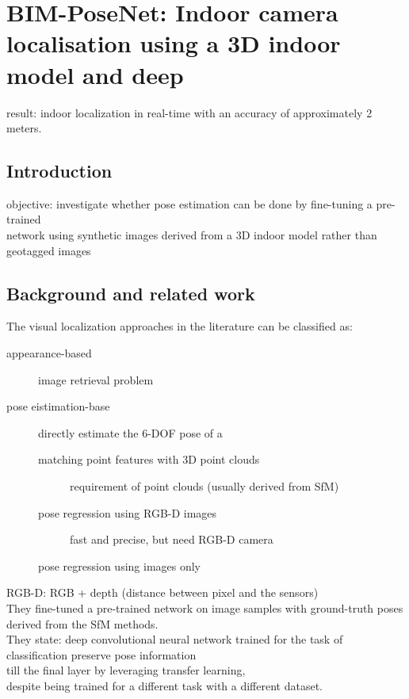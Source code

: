 \documentclass[11pt]{article}
\begin{document}
\section{BIM-PoseNet: Indoor camera localisation using a 3D indoor model and deep}
\label{sec-5}
result: indoor localization in real-time with an accuracy of approximately 2 meters. \\
\subsection{Introduction}
\label{sec-5-1}
objective: investigate whether pose estimation can be done by fine-tuning a pre-trained \\
           network using synthetic images derived from a 3D indoor model rather than geotagged images \\
\subsection{Background and related work}
\label{sec-5-2}
The visual localization approaches in the literature can be classified as: \\
\begin{description}
\item[{appearance-based}] image retrieval problem \\
\item[{pose eistimation-base}] directly estimate the 6-DOF pose of a \\
\begin{description}
\item[{matching point features with 3D point clouds}] requirement of point clouds (usually derived from SfM) \\
\item[{pose regression using RGB-D images}] fast and precise, but need RGB-D camera \\
\item[{pose regression using images only}] 
\end{description}
\end{description}

RGB-D: RGB + depth (distance between pixel and the sensors) \\

They fine-tuned a pre-trained network on image samples with ground-truth poses derived from the SfM methods. \\

They state: deep convolutional neural network trained for the task of classification preserve pose information \\
till the final layer by leveraging transfer learning, \\
despite being trained for a different task with a different dataset. \\
\end{document}
